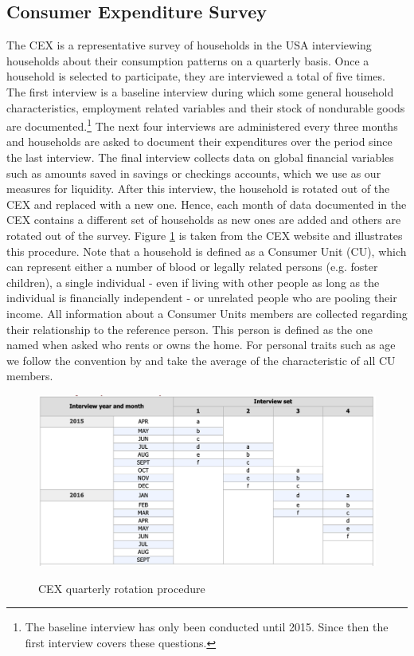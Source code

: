 \subsection{Consumer Expenditure Survey} 
The CEX is a representative survey of households in the USA interviewing households about their consumption patterns on a quarterly basis. Once a household is selected to participate, they are interviewed a total of five times. The first interview is a baseline interview during which some general household characteristics, employment related variables and their stock of nondurable goods are documented.\footnote{The baseline interview has only been conducted until 2015. Since then the first interview covers these questions.} The next four interviews are administered every three months and households are asked to document their expenditures over the period since the last interview. The final interview collects data on global financial variables such as amounts saved in savings or checkings accounts, which we use as our measures for liquidity. After this interview, the household is rotated out of the CEX and replaced with a new one. Hence, each month of data documented in the CEX contains a different set of households as new ones are added and others are rotated out of the survey. Figure \ref{fig:cex_rotation} is taken from the CEX website and illustrates this procedure. Note that a household is defined as a Consumer Unit (CU), which can represent either a number of blood or legally related persons (e.g. foster children), a single individual - even if living with other people as long as the individual is financially independent - or unrelated people who are pooling their income. All information about a Consumer Units members are collected regarding their relationship to the reference person. This person is defined as the one named when asked who rents or owns the home. For personal traits such as age we follow the convention by \cite{parker_etal_13} and take the average of the characteristic of all CU members.
\begin{figure}[t]
    \caption{CEX quarterly rotation procedure}
    \centering
    \includegraphics[width=.9\linewidth]{figures/CEX_rotation_table.png}
    \label{fig:cex_rotation}
\end{figure}
